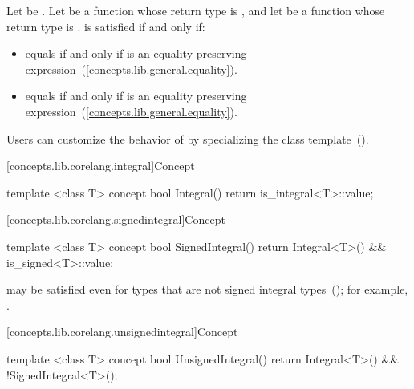 \begin{itemdescr}
\pnum
Let  be . Let
 be a function whose return type is , and let  be a function
whose return type is .  is satisfied if and only if:
\begin{itemize}
\item {} equals  if and only if
   is an equality preserving
  expression~(\ref{concepts.lib.general.equality}).
\item {} equals  if and only if
   is an equality preserving
  expression~(\ref{concepts.lib.general.equality}).
\end{itemize}

\pnum
\enternote Users can customize the behavior of  by specializing the 
class template~().\exitnote

\end{itemdescr}

[concepts.lib.corelang.integral]{Concept }

%
\begin{itemdecl}
template <class T>
concept bool Integral() {
  return is_integral<T>::value;
}
\end{itemdecl}

[concepts.lib.corelang.signedintegral]{Concept }

%
\begin{itemdecl}
template <class T>
concept bool SignedIntegral() {
  return Integral<T>() && is_signed<T>::value;
}
\end{itemdecl}

\begin{itemdescr}
\pnum
\enternote {} may be satisfied even for
types that are not signed integral types~();
for example, .
\exitnote
\end{itemdescr}

[concepts.lib.corelang.unsignedintegral]{Concept }

%
\begin{itemdecl}
template <class T>
concept bool UnsignedIntegral() {
  return Integral<T>() && !SignedIntegral<T>();
}
\end{itemdecl}

